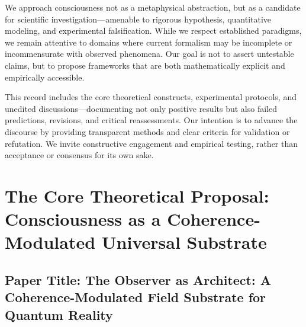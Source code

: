 \documentclass[11pt, a4paper]{book}
\begin{document}
We approach consciousness not as a metaphysical abstraction, but as a candidate for scientific investigation—amenable to rigorous hypothesis, quantitative modeling, and experimental falsification. While we respect established paradigms, we remain attentive to domains where current formalism may be incomplete or incommensurate with observed phenomena. Our goal is not to assert untestable claims, but to propose frameworks that are both mathematically explicit and empirically accessible.

This record includes the core theoretical constructs, experimental protocols, and unedited discussions—documenting not only positive results but also failed predictions, revisions, and critical reassessments. Our intention is to advance the discourse by providing transparent methods and clear criteria for validation or refutation. We invite constructive engagement and empirical testing, rather than acceptance or consensus for its own sake.
\mainmatter

\part{The Core Theoretical Proposal: Consciousness as a Coherence-Modulated Universal Substrate}
\label{part:coreproposal_main}

\chapter*{Paper Title: The Observer as Architect: A Coherence-Modulated Field Substrate for Quantum Reality}
\end{document}
